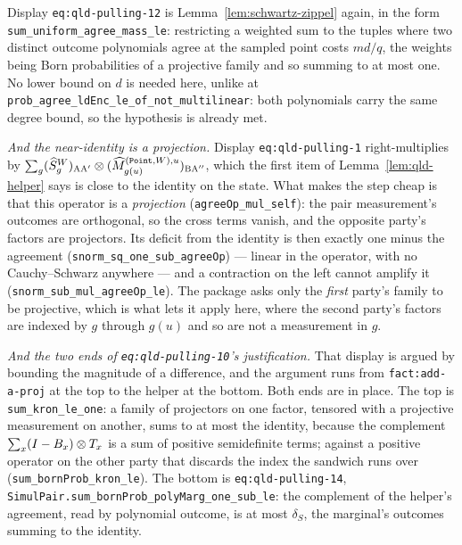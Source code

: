 Display \texttt{eq:qld-pulling-12} is Lemma~\ref{lem:schwartz-zippel} again, in the form
\texttt{sum\_uniform\_agree\_mass\_le}: restricting a weighted sum to the tuples where two
distinct outcome polynomials agree at the sampled point costs $md/q$, the weights being Born
probabilities of a projective family and so summing to at most one. No lower bound on $d$ is needed
here, unlike at \texttt{prob\_agree\_ldEnc\_le\_of\_not\_multilinear}: both polynomials carry
the same degree bound, so the hypothesis is already met.

\emph{And the near-identity is a projection.} Display \texttt{eq:qld-pulling-1} right-multiplies
by $\sum_g (\widehat S^W_g)_{\textsc{A}\textsc{A}'} \otimes
(\widehat M^{(\mathtt{Point},W),u}_{g(u)})_{\textsc{B}\textsc{A}''}$, which the first item of
Lemma~\ref{lem:qld-helper} says is close to the identity on the state. What makes the step cheap
is that this operator is a \emph{projection} (\texttt{agreeOp\_mul\_self}): the pair
measurement's outcomes are orthogonal, so the cross terms vanish, and the opposite party's factors
are projectors. Its deficit from the identity is then exactly one minus the agreement
(\texttt{snorm\_sq\_one\_sub\_agreeOp}) --- linear in the operator, with no Cauchy--Schwarz
anywhere --- and a contraction on the left cannot amplify it
(\texttt{snorm\_sub\_mul\_agreeOp\_le}). The package asks only the \emph{first} party's family
to be projective, which is what lets it apply here, where the second party's factors are indexed
by $g$ through $g(u)$ and so are not a measurement in $g$.

\emph{And the two ends of \texttt{eq:qld-pulling-10}'s justification.} That display is argued by
bounding the magnitude of a difference, and the argument runs from
\texttt{fact:add-a-proj} at the top to the helper at the bottom. Both ends are in place. The top
is \texttt{sum\_kron\_le\_one}: a family of projectors on one factor, tensored with a projective
measurement on another, sums to at most the identity, because the complement
$\sum_x (I - B_x) \otimes T_x$ is a sum of positive semidefinite terms; against a positive
operator on the other party that discards the index the sandwich runs over
(\texttt{sum\_bornProb\_kron\_le}). The bottom is \texttt{eq:qld-pulling-14},
\texttt{SimulPair.sum\_bornProb\_polyMarg\_one\_sub\_le}: the complement of the helper's
agreement, read by polynomial outcome, is at most $\delta_S$, the marginal's outcomes summing to
the identity.

